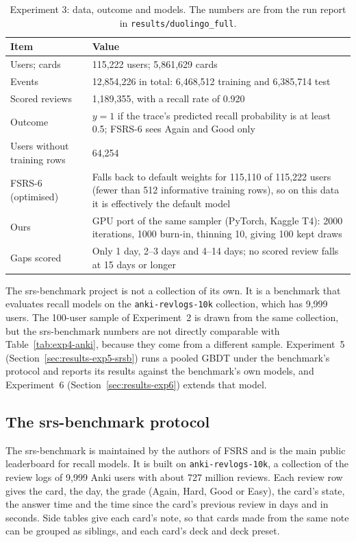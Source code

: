 \begin{table}[htbp]
  \centering
  \caption[Experiment 3: setup]{Experiment 3: data, outcome and models. The numbers are from the run report
    in \texttt{results/duolingo\_full}.}
  \label{tab:exp3-setup}
  \begin{tabular}{@{}lp{9.5cm}@{}}
    \toprule
    Item & Value \\
    \midrule
    Users; cards & 115,222 users; 5,861,629 cards \\
    Events & 12,854,226 in total: 6,468,512 training and 6,385,714 test \\
    Scored reviews & 1,189,355, with a recall rate of 0.920 \\
    Outcome & $y=1$ if the trace's predicted recall probability is at least 0.5; FSRS-6 sees Again and Good only \\
    Users without training rows & 64,254 \\
    FSRS-6 (optimised) & Falls back to default weights for 115,110 of 115,222 users (fewer than 512 informative training rows), so on this data it is effectively the default model \\
    Ours & GPU port of the same sampler (PyTorch, Kaggle T4): 2000 iterations, 1000 burn-in, thinning 10, giving 100 kept draws \\
    Gaps scored & Only 1 day, 2--3 days and 4--14 days; no scored review falls at 15 days or longer \\
    \bottomrule
  \end{tabular}
\end{table}

The srs-benchmark project \cite{srsbenchmark} is not a collection of its own. It is a benchmark that evaluates recall models on the \texttt{anki-revlogs-10k} collection, which has 9,999 users. The 100-user sample of Experiment~2 is drawn from the same collection, but the srs-benchmark numbers are not directly comparable with Table~\ref{tab:exp4-anki}, because they come from a different sample. Experiment~5 (Section~\ref{sec:results-exp5-srsb}) runs a pooled GBDT under the benchmark's protocol and reports its results against the benchmark's own models, and Experiment~6 (Section~\ref{sec:results-exp6}) extends that model.

\subsection{The srs-benchmark protocol}
\label{sec:design-srsb}

The srs-benchmark is maintained by the authors of FSRS and is the main public leaderboard for recall models. It is built on
\texttt{anki-revlogs-10k}, a collection of the review logs of 9,999 Anki users with about 727 million reviews. Each review
row gives the card, the day, the grade (Again, Hard, Good or Easy), the card's state, the answer time and the time since the
card's previous review in days and in seconds. Side tables give each card's note, so that cards made from the same note can
be grouped as siblings, and each card's deck and deck preset.

